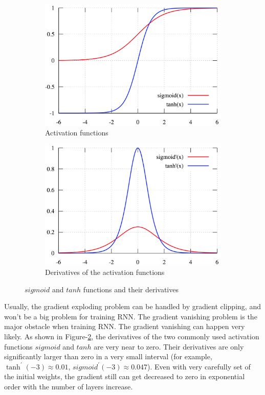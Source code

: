\documentclass[english]{article}
\begin{document}
\begin{figure}[htbp]
	\begin{subfigure}{0.5\textwidth}
  		\centering
 		 \includegraphics[width=0.95\linewidth]{active}
  		\caption{Activation functions}
  		\label{fig:nnet-active}
	\end{subfigure}
	\begin{subfigure}{0.5\textwidth}
 	 	\centering
 	 	\includegraphics[width=0.95\linewidth]{derivate}
 	 	\caption{Derivatives of the activation functions}
 	 	\label{fig:nnet-derivate}
	\end{subfigure}
	\caption{$sigmoid$ and $tanh$ functions and their derivatives}
	\label{fig:nnet-functions}
\end{figure}


Usually, the gradient exploding problem can be handled by gradient clipping, and won't be a big problem for training RNN. 
The gradient vanishing problem is the major obstacle when training RNN. The gradient vanishing can happen very likely. As shown in Figure-\ref{fig:nnet-derivate}, the derivatives of the two commonly used activation functions $sigmoid$ and $tanh$ are very near to zero. Their derivatives are only significantly larger than zero  in a very small interval (for example, $\tanh^{\prime}(-3) \approx 0.01$, $sigmoid^{\prime}(-3) \approx 0.047$). Even with very carefully set of the initial weights, the gradient still can get decreased to zero in  exponential order with the number of layers increase.
\end{document}
